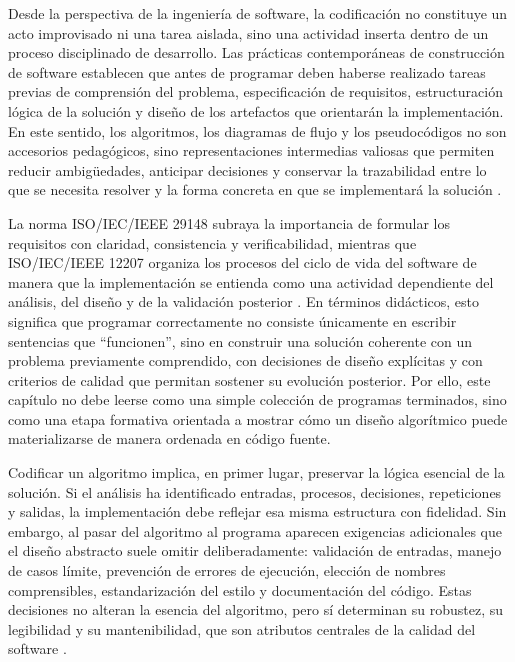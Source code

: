 \documentclass[12pt,twoside]{book}
\begin{document}
			Desde la perspectiva de la ingeniería de software, la codificación no constituye un acto improvisado ni una tarea aislada, sino una actividad inserta dentro de un proceso disciplinado de desarrollo. Las prácticas contemporáneas de construcción de software establecen que antes de programar deben haberse realizado tareas previas de comprensión del problema, especificación de requisitos, estructuración lógica de la solución y diseño de los artefactos que orientarán la implementación. En este sentido, los algoritmos, los diagramas de flujo y los pseudocódigos no son accesorios pedagógicos, sino representaciones intermedias valiosas que permiten reducir ambigüedades, anticipar decisiones y conservar la trazabilidad entre lo que se necesita resolver y la forma concreta en que se implementará la solución \cite{ISOIECIEEE2018Requirements,ISOIECIEEE2017SoftwareLifeCycle,SWEBOK2025Guide,Tegarden2025Systems}.
			
			La norma ISO/IEC/IEEE 29148 subraya la importancia de formular los requisitos con claridad, consistencia y verificabilidad, mientras que ISO/IEC/IEEE 12207 organiza los procesos del ciclo de vida del software de manera que la implementación se entienda como una actividad dependiente del análisis, del diseño y de la validación posterior \cite{ISOIECIEEE2018Requirements,ISOIECIEEE2017SoftwareLifeCycle}. En términos didácticos, esto significa que programar correctamente no consiste únicamente en escribir sentencias que “funcionen”, sino en construir una solución coherente con un problema previamente comprendido, con decisiones de diseño explícitas y con criterios de calidad que permitan sostener su evolución posterior. Por ello, este capítulo no debe leerse como una simple colección de programas terminados, sino como una etapa formativa orientada a mostrar cómo un diseño algorítmico puede materializarse de manera ordenada en código fuente.
			
			Codificar un algoritmo implica, en primer lugar, preservar la lógica esencial de la solución. Si el análisis ha identificado entradas, procesos, decisiones, repeticiones y salidas, la implementación debe reflejar esa misma estructura con fidelidad. Sin embargo, al pasar del algoritmo al programa aparecen exigencias adicionales que el diseño abstracto suele omitir deliberadamente: validación de entradas, manejo de casos límite, prevención de errores de ejecución, elección de nombres comprensibles, estandarización del estilo y documentación del código. Estas decisiones no alteran la esencia del algoritmo, pero sí determinan su robustez, su legibilidad y su mantenibilidad, que son atributos centrales de la calidad del software \cite{ISOIEC2024SystemsSoftwareEngineering,Martin2008Clean,Abid2020Years,Lima2023Software}.
			
\end{document}
